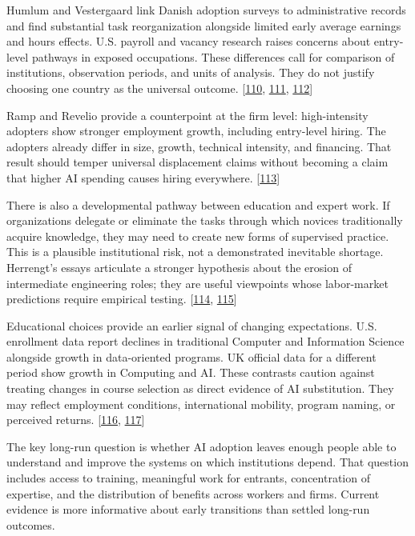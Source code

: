 Humlum and Vestergaard link Danish adoption surveys to administrative records and find substantial task reorganization alongside limited early average earnings and hours effects. U.S. payroll and vacancy research raises concerns about entry-level pathways in exposed occupations. These differences call for comparison of institutions, observation periods, and units of analysis. They do not justify choosing one country as the universal outcome. [\hyperlink{ref-humlum2026}{110}, \hyperlink{ref-stanford2025}{111}, \hyperlink{ref-westby2026}{112}]


Ramp and Revelio provide a counterpoint at the firm level: high-intensity adopters show stronger employment growth, including entry-level hiring. The adopters already differ in size, growth, technical intensity, and financing. That result should temper universal displacement claims without becoming a claim that higher AI spending causes hiring everywhere. [\hyperlink{ref-ramp2026}{113}]


There is also a developmental pathway between education and expert work. If organizations delegate or eliminate the tasks through which novices traditionally acquire knowledge, they may need to create new forms of supervised practice. This is a plausible institutional risk, not a demonstrated inevitable shortage. Herrengt's essays articulate a stronger hypothesis about the erosion of intermediate engineering roles; they are useful viewpoints whose labor-market predictions require empirical testing. [\hyperlink{ref-herrengt2026}{114}, \hyperlink{ref-herrengtvibe}{115}]


Educational choices provide an earlier signal of changing expectations. U.S. enrollment data report declines in traditional Computer and Information Science alongside growth in data-oriented programs. UK official data for a different period show growth in Computing and AI. These contrasts caution against treating changes in course selection as direct evidence of AI substitution. They may reflect employment conditions, international mobility, program naming, or perceived returns. [\hyperlink{ref-nscc2026}{116}, \hyperlink{ref-hesa2026}{117}]


The key long-run question is whether AI adoption leaves enough people able to understand and improve the systems on which institutions depend. That question includes access to training, meaningful work for entrants, concentration of expertise, and the distribution of benefits across workers and firms. Current evidence is more informative about early transitions than settled long-run outcomes.



